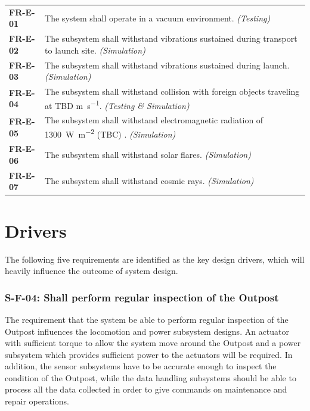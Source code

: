 \documentclass[12pt, letterpaper]{article}
\begin{document}
\begin{longtable}{P{2cm}P{13.75cm}}
\textbf{FR-E-01}	& The system shall operate in a vacuum environment. \textit{(Testing)}													\\
\textbf{FR-E-02}	& The subsystem shall withstand vibrations sustained during transport to launch site. \textit{(Simulation)}		\\
\textbf{FR-E-03}	& The subsystem shall withstand vibrations sustained during launch. \textit{(Simulation)}						\\
\textbf{FR-E-04}	& The subsystem shall withstand collision with foreign objects traveling at TBD \si{\m\per\s}. \textit{(Testing \& Simulation)}														\\
\textbf{FR-E-05}	& The subsystem shall withstand electromagnetic radiation of \SI{1300}{\watt\per\square\m} (TBC) \cite{FAA_radiation}. \textit{(Simulation)}												\\
\textbf{FR-E-06}	& The subsystem shall withstand solar flares. \textit{(Simulation)}												\\
\textbf{FR-E-07}	& The subsystem shall withstand cosmic rays. \textit{(Simulation)}												\\
\end{longtable}
\captionsetup[table]{list=yes}
\setcounter{table}{0}
\newpage
\section{Drivers}
\label{sect:drivers}
The following five requirements are identified as the key design drivers, which will heavily influence the outcome of system design.
\subsubsection*{S-F-04: Shall perform regular inspection of the Outpost}
The requirement that the system be able to perform regular inspection of the Outpost influences the locomotion and power subsystem designs. An actuator with sufficient torque to allow the system move around the Outpost and a power subsystem which provides sufficient power to the actuators will be required. In addition, the sensor subsystems have to be accurate enough to inspect the condition of the Outpost, while the data handling subsystems should be able to process all the data collected in order to give commands on maintenance and repair operations.
\end{document}
